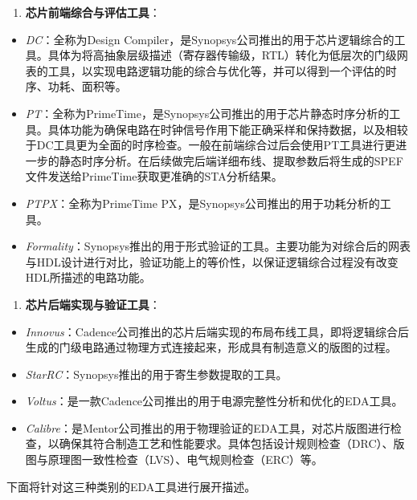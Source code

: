 \begin{enumerate}
\def\labelenumi{\arabic{enumi}.}
\setcounter{enumi}{1}
\tightlist
\item
  \textbf{芯片前端综合与评估工具}：
\end{enumerate}

\begin{itemize}
\tightlist
\item
  \emph{DC}：全称为Design
  Compiler，是Synopsys公司推出的用于芯片逻辑综合的工具。具体为将高抽象层级描述（寄存器传输级，RTL）转化为低层次的门级网表的工具，以实现电路逻辑功能的综合与优化等，并可以得到一个评估的时序、功耗、面积等。
\item
  \emph{PT}：全称为PrimeTime，是Synopsys公司推出的用于芯片静态时序分析的工具。具体功能为确保电路在时钟信号作用下能正确采样和保持数据，以及相较于DC工具更为全面的时序检查。一般在前端综合过后会使用PT工具进行更进一步的静态时序分析。在后续做完后端详细布线、提取参数后将生成的SPEF文件发送给PrimeTime获取更准确的STA分析结果。
\item
  \emph{PTPX}：全称为PrimeTime PX，是Synopsys公司推出的用于功耗分析的工具。
\item
  \emph{Formality}：Synopsys推出的用于形式验证的工具。主要功能为对综合后的网表与HDL设计进行对比，验证功能上的等价性，以保证逻辑综合过程没有改变HDL所描述的电路功能。
\end{itemize}

\begin{enumerate}
\def\labelenumi{\arabic{enumi}.}
\setcounter{enumi}{2}
\tightlist
\item
  \textbf{芯片后端实现与验证工具}：
\end{enumerate}

\begin{itemize}
\tightlist
\item
  \emph{Innovus}：Cadence公司推出的芯片后端实现的布局布线工具，即将逻辑综合后生成的门级电路通过物理方式连接起来，形成具有制造意义的版图的过程。
\item
  \emph{StarRC}：Synopsys推出的用于寄生参数提取的工具。
\item
  \emph{Voltus}：是一款Cadence公司推出的用于电源完整性分析和优化的EDA工具。
\item
  \emph{Calibre}：是Mentor公司推出的用于物理验证的EDA工具，对芯片版图进行检查，以确保其符合制造工艺和性能要求。具体包括设计规则检查（DRC）、版图与原理图一致性检查（LVS）、电气规则检查（ERC）等。
\end{itemize}

下面将针对这三种类别的EDA工具进行展开描述。

